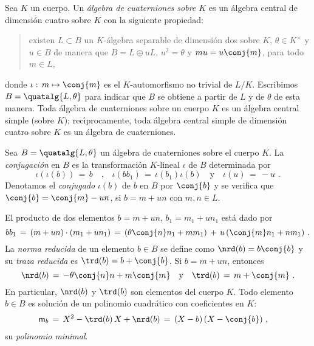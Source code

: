 Sea $K$ un cuerpo. Un \emph{\'{a}lgebra de cuaterniones sobre $K$}
es un \'{a}lgebra central de dimensi\'{o}n cuatro sobre $K$ con la siguiente
propiedad:
\begin{quote}
	existen $L\subset B$ un $K$-\'{a}lgebra separable de dimensi\'{o}n dos
	sobre $K$, $\theta\in K^{\times}$ y $u\in B$ de manera que
	$B=L\oplus uL$, $u^{2}=\theta$ y $mu=u\conj{m}$, para todo $m\in L$,
\end{quote}
donde $\iota:\,m\mapsto \conj{m}$ es el $K$-automorfismo no trivial de $L/K$.
Escribimos $B=\quatalg{L,\theta}$ para indicar que $B$ se obtiene a partir de
$L$ y de $\theta$ de esta manera. Toda \'{a}lgebra de cuaterniones sobre un
cuerpo $K$ es un \'{a}lgebra central simple (sobre $K$); rec\'{\i}procamente,
toda \'{a}lgebra central simple de dimensi\'{o}n cuatro sobre $K$ es un
\'{a}lgebra de cuaterniones.

Sea $B=\quatalg{L,\theta}$ un \'{a}lgebra de cuaterniones sobre el cuerpo $K$.
La \emph{conjugaci\'{o}n} en $B$
es la transformaci\'{o}n $K$-lineal $\iota$ de $B$ determinada por
\begin{equation}
	\label{eq:conjugacioncuaterniones}
	\iota(\iota(b))\,=\,b \quad\text{,}\quad
	\iota(bb_{1}) \,=\,\iota(b_{1})\iota(b) \quad\text{y}\quad
	\iota(u)\,=\,-u
	\text{ .}
\end{equation}
%
Denotamos el \emph{conjugado}
$\iota(b)$ de $b$ en $B$ por $\conj{b}$ y se verifica que
$\conj{b}=\conj{m}-un$, si $b=m+un$ con $m,n\in L$.

El producto de dos elementos $b=m+un$, $b_{1}=m_{1}+un_{1}$ est\'{a} dado por
\begin{equation}
	\label{eq:productocuaterniones}
	bb_{1} \,=\,(m+un)\cdot (m_{1}+un_{1}) \,=\,
		(\theta\conj{n}n_{1}+mm_{1})\,+\,u\,(\conj{m}n_{1}+nm_{1})
	\text{ .}
\end{equation}
%
La \emph{norma reducida} de un elemento $b\in B$ se define como
$\nrd(b)=b\conj{b}$ y su \emph{traza reducida} es $\trd(b)=b+\conj{b}$.
Si $b=m+un$, entonces
\begin{equation}
	\label{eq:normaytrazacuaterniones}
	\nrd(b) \,=\,-\theta\conj{n}n+m\conj{m}	\quad\text{y}\quad
		\trd(b) \,=\,m+\conj{m}
	\text{ .}
\end{equation}
%
En particular, $\nrd(b)$ y $\trd(b)$ son elementos del cuerpo $K$. Todo
elemento $b\in B$ es soluci\'{o}n de un polinomio cuadr\'{a}tico con
coeficientes en $K$:
\begin{align*}
	\mathsf{m}_{b} & \,=\,X^{2}-\trd(b)\,X+\nrd(b) \,=\,(X-b)\,(X-\conj{b})
	\text{ ,}
\end{align*}
%
su \emph{polinomio minimal}.

